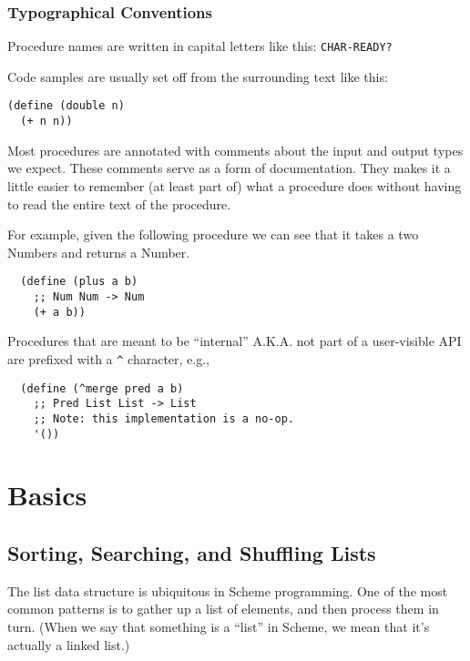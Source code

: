 \documentclass[12pt,openright,draft]{book}
\begin{document}
\section{Typographical Conventions}

Procedure names are written in capital letters like this:
\verb|CHAR-READY?|

Code samples are usually set off from the surrounding text like this:

\begin{verbatim}
(define (double n)
  (+ n n))
\end{verbatim}

Most procedures are annotated with comments about the input and output
types we expect.  These comments serve as a form of documentation.
They makes it a little easier to remember (at least part of) what a
procedure does without having to read the entire text of the
procedure.

For example, given the following procedure we can see that it takes a
two Numbers and returns a Number.

\begin{verbatim}
  (define (plus a b)
    ;; Num Num -> Num
    (+ a b))
\end{verbatim}

Procedures that are meant to be ``internal'' A.K.A. not part of a
user-visible API are prefixed with a \verb|^| character, e.g.,

\begin{verbatim}
  (define (^merge pred a b)
    ;; Pred List List -> List
    ;; Note: this implementation is a no-op.
    '())
\end{verbatim}


\mainmatter{}
\part{Basics}
\chapter{Sorting, Searching, and Shuffling Lists}

The list data structure is ubiquitous in Scheme programming.  One of
the most common patterns is to gather up a list of elements, and then
process them in turn.  (When we say that something is a ``list'' in
Scheme, we mean that it's actually a linked list.)
\end{document}
